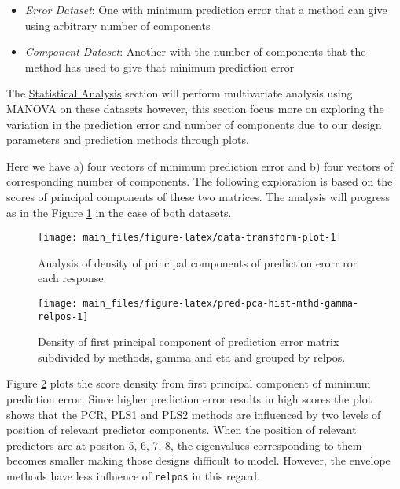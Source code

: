 \documentclass[12pt,3p,authoryear]{elsarticle}
\providecommand{\tightlist}{%
  \setlength{\itemsep}{0pt}\setlength{\parskip}{0pt}}
\begin{document}
\begin{itemize}
\tightlist
\item
  \emph{Error Dataset}: One with minimum prediction error that a method
  can give using arbitrary number of components
\item
  \emph{Component Dataset}: Another with the number of components that
  the method has used to give that minimum prediction error
\end{itemize}

The \protect\hyperlink{statistical-analysis}{Statistical Analysis}
section will perform multivariate analysis using MANOVA on these
datasets however, this section focus more on exploring the variation in
the prediction error and number of components due to our design
parameters and prediction methods through plots.

Here we have a) four vectors of minimum prediction error and b) four
vectors of corresponding number of components. The following exploration
is based on the scores of principal components of these two matrices.
The analysis will progress as in the Figure
\ref{fig:data-transform-plot} in the case of both datasets.




\begin{figure}

{\centering \texttt{[image: main\_files/figure-latex/data-transform-plot-1]} 

}

\caption{Analysis of density of principal components of
prediction erorr ror each response.}\label{fig:data-transform-plot}
\end{figure}




\begin{figure}[!htb]
\texttt{[image: main\_files/figure-latex/pred-pca-hist-mthd-gamma-relpos-1]} \caption{Density of first principal component of prediction error
matrix subdivided by methods, gamma and eta and grouped by relpos.}\label{fig:pred-pca-hist-mthd-gamma-relpos}
\end{figure}

Figure \ref{fig:pred-pca-hist-mthd-gamma-relpos} plots the score density
from first principal component of minimum prediction error. Since higher
prediction error results in high scores the plot shows that the PCR,
PLS1 and PLS2 methods are influenced by two levels of position of
relevant predictor components. When the position of relevant predictors
are at positon 5, 6, 7, 8, the eigenvalues corresponding to them becomes
smaller making those designs difficult to model. However, the envelope
methods have less influence of \texttt{relpos} in this regard.
\end{document}

